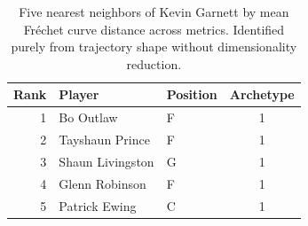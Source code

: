 \begin{table}[htbp]
  \centering\small
  \begin{tabular}{rllc}
    \toprule
    Rank & Player & Position & Archetype \\
    \midrule
    1 & Bo Outlaw & F & 1 \\
    2 & Tayshaun Prince & F & 1 \\
    3 & Shaun Livingston & G & 1 \\
    4 & Glenn Robinson & F & 1 \\
    5 & Patrick Ewing & C & 1 \\
    \bottomrule
  \end{tabular}
  \caption{Five nearest neighbors of Kevin Garnett by mean Fr\'{e}chet curve distance across metrics. Identified purely from trajectory shape without dimensionality reduction.}
  \label{tab:Kevin_Garnett_frechet_curve_neighbors}
\end{table}

